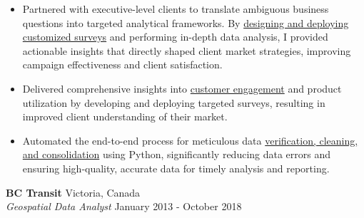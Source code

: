 \documentclass[letterpaper]{article}
\newcommand{\employer}[4]{
        \vspace{3pt}
        \textbf{#1}  %
        \hfill #2\\  %
        \textit{#3}  %
        \hfill #4\\  %
        \vspace{3mm}
    }
\newenvironment{jobtasklist}
        {
            \vspace{-12pt}
            \begin{itemize} \itemsep 0pt
        }{
            \end{itemize}
            \vspace{-3pt}
        }
\newcommand{\impt}[1]{\uline{#1}}
\begin{document}
\begin{jobtasklist}
        \item Partnered with executive-level clients to translate ambiguous business questions
            into targeted analytical frameworks.
            By \impt{designing and deploying customized surveys} and performing in-depth data analysis,
            I provided actionable insights that directly shaped client market strategies,
            improving campaign effectiveness and client satisfaction.
        \item Delivered comprehensive insights into \impt{customer engagement} and product utilization by developing
                and deploying targeted surveys, resulting in improved client understanding of their market.
        \item Automated the end-to-end process for meticulous data
                \impt{verification, cleaning, and consolidation} using Python,
                significantly reducing data errors and ensuring high-quality, accurate data for timely analysis and reporting.
\end{jobtasklist}


\employer
    {BC Transit}
    {Victoria, Canada}
    {Geospatial Data Analyst}
    {January 2013 - October 2018}
\end{document}
